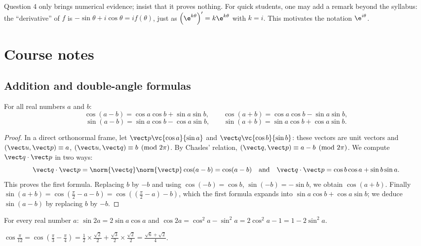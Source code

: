 \begin{teachernote}
Question 4 only brings numerical evidence; insist that it proves nothing. For quick students, one may add a remark beyond the syllabus: the ``derivative'' of $f$ is $-\sin\theta+i\cos\theta=if(\theta)$, just as $\left(\e^{k\theta}\right)'=k\e^{k\theta}$ with $k=i$. This motivates the notation $\e^{i\theta}$.
\end{teachernote}

\mxnewpage
\section{Course notes}
\subsection{Addition and double-angle formulas}
\begin{theorem}
For all real numbers $a$ and $b$:
\[\cos(a-b)=\cos a\cos b+\sin a\sin b,\qquad\cos(a+b)=\cos a\cos b-\sin a\sin b,\]
\[\sin(a-b)=\sin a\cos b-\cos a\sin b,\qquad\sin(a+b)=\sin a\cos b+\cos a\sin b.\]
\end{theorem}
\begin{proof}
In a direct orthonormal frame, let $\vect p\vc{\cos a}{\sin a}$ and $\vect q\vc{\cos b}{\sin b}$: these vectors are unit vectors and $\left(\vect u,\vect p\right)\equiv a$, $\left(\vect u,\vect q\right)\equiv b\pmod{2\pi}$. By Chasles' relation, $\left(\vect q,\vect p\right)\equiv a-b\pmod{2\pi}$. We compute $\vect q\cdot\vect p$ in two ways:
\[\vect q\cdot\vect p=\norm{\vect q}\norm{\vect p}\cos(a-b)=\cos(a-b)\quad\text{and}\quad\vect q\cdot\vect p=\cos b\cos a+\sin b\sin a.\]
This proves the first formula. Replacing $b$ by $-b$ and using $\cos(-b)=\cos b$, $\sin(-b)=-\sin b$, we obtain $\cos(a+b)$. Finally $\sin(a+b)=\cos\left(\frac\pi2-a-b\right)=\cos\left(\left(\frac\pi2-a\right)-b\right)$, which the first formula expands into $\sin a\cos b+\cos a\sin b$; we deduce $\sin(a-b)$ by replacing $b$ by $-b$.
\end{proof}
\begin{theorem}
For every real number $a$: $\sin2a=2\sin a\cos a$ and $\cos2a=\cos^2a-\sin^2a=2\cos^2a-1=1-2\sin^2a$.
\end{theorem}
\begin{example}
$\cos\frac{\pi}{12}=\cos\left(\frac\pi3-\frac\pi4\right)=\frac12\times\frac{\sqrt2}2+\frac{\sqrt3}2\times\frac{\sqrt2}2=\frac{\sqrt6+\sqrt2}4$.
\end{example}

